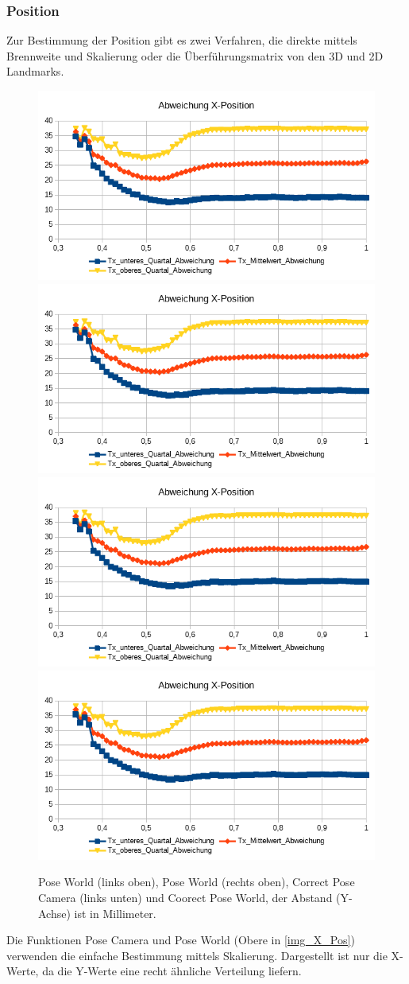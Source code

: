 \subsubsection{Position}
Zur Bestimmung der Position gibt es zwei Verfahren, die direkte mittels Brennweite und Skalierung oder die Überführungsmatrix von den 3D und 2D Landmarks.\\
\begin{figure}
	\centering
	\includegraphics[width=0.45\linewidth]{tabelle/X_Pos_PC}
	\includegraphics[width=0.45\linewidth]{tabelle/X_Pos_PW}
	\includegraphics[width=0.45\linewidth]{tabelle/X_Pos_CPC}
	\includegraphics[width=0.45\linewidth]{tabelle/X_Pos_CPW}
	\caption{Pose World (links oben), Pose World (rechts oben), Correct Pose Camera (links unten) und Coorect Pose World, der Abstand (Y-Achse) ist in Millimeter.}
	\label{img_X_Pos}
\end{figure}
Die Funktionen Pose Camera und Pose World (Obere in \autoref{img_X_Pos}) verwenden die einfache Bestimmung mittels Skalierung. Dargestellt ist nur die X-Werte, da die Y-Werte eine recht ähnliche Verteilung liefern.\\

